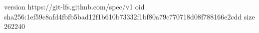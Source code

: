 version https://git-lfs.github.com/spec/v1
oid sha256:1ef59c8afd4fbfb5bad12f1b610b73332f1bf80a79c770718d08f788166e2cdd
size 262240
